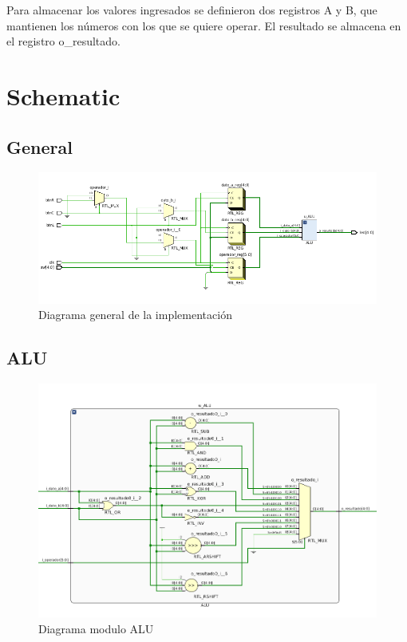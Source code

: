 \documentclass[a4paper]{article}
\begin{document}
Para almacenar los valores ingresados se definieron dos registros A y B, que mantienen los números con los que se quiere operar. 
El resultado se almacena en el registro o\_resultado.\\

\section{Schematic}
\subsection{General}
\begin{figure}[!htb]
\centering
\includegraphics[scale=0.5]{schematic.png}
\caption{\label{fig:tests}{Diagrama general de la implementación}}
\end{figure}
\subsection{ALU}
\begin{figure}[!htb]
\centering
\includegraphics[scale=0.4]{alu.png}
\caption{\label{fig:tests}Diagrama modulo ALU}
\end{figure}
\end{document}
